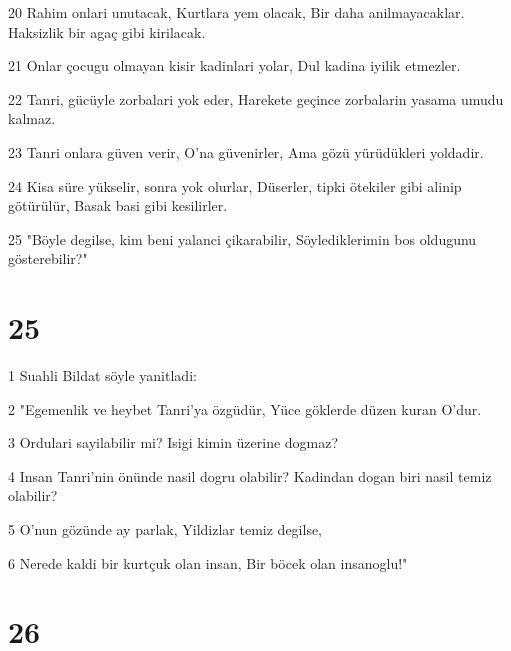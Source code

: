 \par 20 Rahim onlari unutacak, Kurtlara yem olacak, Bir daha anilmayacaklar. Haksizlik bir agaç gibi kirilacak.
\par 21 Onlar çocugu olmayan kisir kadinlari yolar, Dul kadina iyilik etmezler.
\par 22 Tanri, gücüyle zorbalari yok eder, Harekete geçince zorbalarin yasama umudu kalmaz.
\par 23 Tanri onlara güven verir, O'na güvenirler, Ama gözü yürüdükleri yoldadir.
\par 24 Kisa süre yükselir, sonra yok olurlar, Düserler, tipki ötekiler gibi alinip götürülür, Basak basi gibi kesilirler.
\par 25 "Böyle degilse, kim beni yalanci çikarabilir, Söylediklerimin bos oldugunu gösterebilir?"

\chapter{25}

\par 1 Suahli Bildat söyle yanitladi:
\par 2 "Egemenlik ve heybet Tanri'ya özgüdür, Yüce göklerde düzen kuran O'dur.
\par 3 Ordulari sayilabilir mi? Isigi kimin üzerine dogmaz?
\par 4 Insan Tanri'nin önünde nasil dogru olabilir? Kadindan dogan biri nasil temiz olabilir?
\par 5 O'nun gözünde ay parlak, Yildizlar temiz degilse,
\par 6 Nerede kaldi bir kurtçuk olan insan, Bir böcek olan insanoglu!"

\chapter{26}

